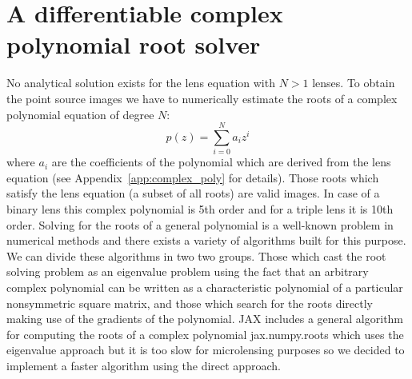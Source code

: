 \documentclass[12pt,dvipsnames]{report}
\newcommand{\ssf}[1]{\textsf{#1}}
\begin{document}
\section{A differentiable complex polynomial root solver}
No analytical solution exists for the lens equation with $N>1$ lenses. To obtain the point
source images we have to numerically estimate the roots of a complex polynomial 
equation of degree $N$:
\begin{equation}
    p(z)=\sum_{i=0}^{N} a_i z^i
    \label{eq:general_complex_poly}
\end{equation}
where $a_i$ are the coefficients of the polynomial which are derived from the lens equation
(see Appendix~\ref{app:complex_poly} for details). Those roots which satisfy the lens 
equation (a subset of all roots) are valid images.
In case of a binary lens this complex polynomial is 5th order  and for a triple lens it is 10th 
order. Solving for the roots of a general polynomial is a well-known problem in numerical methods 
and there exists a variety of algorithms built for this purpose.
We can divide these algorithms in two two groups. 
Those which cast the root solving problem as an eigenvalue problem using the fact that 
an arbitrary complex polynomial can be written as a characteristic polynomial of a 
particular nonsymmetric square matrix, and those which search for the roots directly making 
use of the gradients of the polynomial. \ssf{JAX} includes a general algorithm for computing
the roots of a complex polynomial \ssf{jax.numpy.roots} which uses the eigenvalue 
approach but it is too slow for microlensing purposes so we decided to implement a faster
algorithm using the direct approach.
\end{document}
